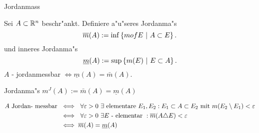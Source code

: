 \documentclass[class=article, crop=false]{standalone}
\begin{document}
\begin{zettel}{Jordanmass}
\begin{definition}[Jordanmass]
	Sei $A \subset \mathbb{R}^n$ beschr"ankt. Definiere a"u"seres Jordanma"s
	\[
		\bar{m}(A):= \inf \set{m of E}{A \subset  E}
	.\]
	und inneres Jordanma"s
	\[
		\underline{m }(A):= \sup \set{m(E)}{E \subset  A}
	.\]
	$A$ - jordanmessbar $\iff \underline{m}(A) = \bar{m}(A)$.

	Jordanma"s $m^J(A) := \bar{m }(A)= \underline{m }(A)$
\end{definition}

\begin{lemma}
	\begin{align*}
		A \tx{Jordan- messbar} & \iff \forall\varepsilon>0 \exists \tx{elementare} E_1, E_2 : E_1 \subset  A \subset E_2 \tx{mit}  m(E_2 \setminus  E_1) < \varepsilon \\
		                       & \iff \forall\varepsilon>0 \exists E \tx{- elementar} : \bar{m}( A \triangle E ) < \varepsilon                                         \\
		                       & \iff \bar{m}(A)= \underline{m }(A)
	\end{align*}
\end{lemma}

\end{zettel}
\end{document}
